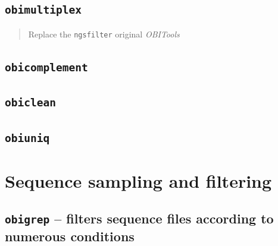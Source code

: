 \documentclass[
  letterpaper,
  DIV=11,
  numbers=noendperiod]{scrreprt}
\begin{document}
\hypertarget{obimultiplex}{%
\section{\texorpdfstring{\texttt{obimultiplex}}{obimultiplex}}\label{obimultiplex}}

\begin{quote}
Replace the \texttt{ngsfilter} original \emph{OBITools}
\end{quote}

\hypertarget{obicomplement}{%
\section{\texorpdfstring{\texttt{obicomplement}}{obicomplement}}\label{obicomplement}}

\hypertarget{obiclean}{%
\section{\texorpdfstring{\texttt{obiclean}}{obiclean}}\label{obiclean}}

\hypertarget{obiuniq}{%
\section{\texorpdfstring{\texttt{obiuniq}}{obiuniq}}\label{obiuniq}}

\hypertarget{sequence-sampling-and-filtering}{%
\chapter{Sequence sampling and
filtering}\label{sequence-sampling-and-filtering}}

\hypertarget{obigrep-filters-sequence-files-according-to-numerous-conditions}{%
\section{\texorpdfstring{\texttt{obigrep} -- filters sequence files
according to numerous
conditions}{obigrep -- filters sequence files according to numerous conditions}}\label{obigrep-filters-sequence-files-according-to-numerous-conditions}}
\end{document}
